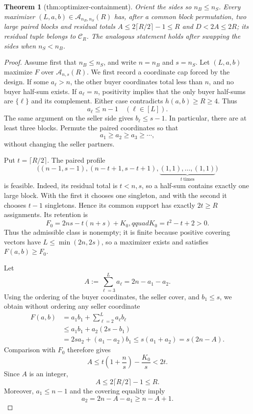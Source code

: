\documentclass{article}
\newtheorem{theorem}{Theorem}
\begin{document}
\begin{theorem}[thm:optimizer-containment]\label{thm:optimizer-containment}
Orient the sides so \(n_B\le n_S\). Every maximizer \((L,a,b)\in\mathcal A_{n_B,n_S}(R)\) has, after a common block permutation, two large paired blocks and residual totals \(A\le2\lceil R/2\rceil-1\le R\) and \(D<2A\le2R\); its residual tuple belongs to \(\mathcal C_R\). The analogous statement holds after swapping the sides when \(n_S<n_B\).
\end{theorem}
\begin{proof}
Assume first that \(n_B\le n_S\), and write \(n=n_B\) and \(s=n_S\).  Let \((L,a,b)\) maximize \(F\) over \(\mathcal A_{n,s}(R)\).  We first record a coordinate cap forced by the design.  If some \(a_\ell>n\), the other buyer coordinates total less than \(n\), and no buyer half-sum exists.  If \(a_\ell=n\), positivity implies that the only buyer half-sums are \(\{\ell\}\) and its complement.  Either case contradicts \(h(a,b)\ge R\ge4\).  Thus
\[
 a_\ell\le n-1\quad(\ell\in[L]).
\]
The same argument on the seller side gives \(b_\ell\le s-1\).  In particular, there are at least three blocks.  Permute the paired coordinates so that
\[
 a_1\ge a_2\ge a_3\ge\cdots,
\]
without changing the seller partners.

Put \(t=\lceil R/2\rceil\).  The paired profile
\[
 \bigl((n-1,s-1),(n-t+1,s-t+1),
       \underbrace{(1,1),\ldots,(1,1)}_{t\ \mathrm{times}}\bigr)
\]
is feasible.  Indeed, its residual total is \(t<n,s\), so a half-sum contains exactly one large block.  With the first it chooses one singleton, and with the second it chooses \(t-1\) singletons.  Hence its common support has exactly \(2t\ge R\) assignments.  Its retention is
\[
 F_0=2ns-t(n+s)+K_0,qquad K_0=t^2-t+2>0.
\]
Thus the admissible class is nonempty; it is finite because positive covering vectors have \(L\le\min(2n,2s)\), so a maximizer exists and satisfies \(F(a,b)\ge F_0\).

Let
\[
 A:=\sum_{\ell=3}^L a_\ell=2n-a_1-a_2.
\]
Using the ordering of the buyer coordinates, the seller cover, and \(b_1\le s\), we obtain without ordering any seller coordinate
\[
\begin{aligned}
 F(a,b)
 &=a_1b_1+\sum_{\ell=2}^L a_\ell b_\ell\\
 &\le a_1b_1+a_2(2s-b_1)\\
 &=2sa_2+(a_1-a_2)b_1
 \le s(a_1+a_2)=s(2n-A).
\end{aligned}
\]
Comparison with \(F_0\) therefore gives
\[
 A\le t\left(1+\frac ns\right)-\frac{K_0}{s}<2t.
\]
Since \(A\) is an integer,
\[
 A\le2\lceil R/2\rceil-1\le R.
\]
Moreover, \(a_1\le n-1\) and the covering equality imply
\[
 a_2=2n-A-a_1\ge n-A+1.
\]


\end{proof}
\end{document}
